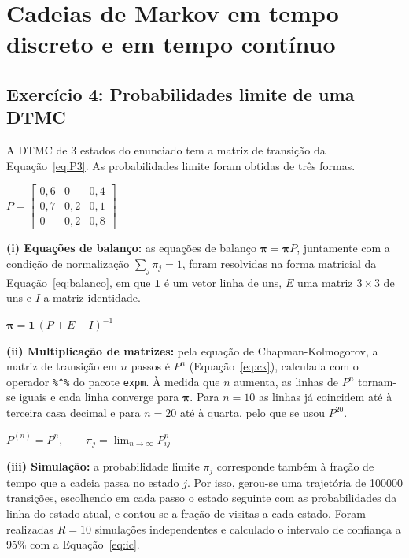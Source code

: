 \documentclass[10pt,a4paper]{article}
\newcommand{\formula}[3]{\begin{equacao}[H]\centering$\displaystyle #1$\caption{#2}\label{#3}\end{equacao}}
\begin{document}
\section{Cadeias de Markov em tempo discreto e em tempo contínuo}

\subsection{Exercício 4: Probabilidades limite de uma DTMC}

A DTMC de 3 estados do enunciado tem a matriz de transição da Equação~\ref{eq:P3}. As probabilidades limite foram obtidas de três formas.

\formula{P=\begin{bmatrix}0{,}6 & 0 & 0{,}4\\ 0{,}7 & 0{,}2 & 0{,}1\\ 0 & 0{,}2 & 0{,}8\end{bmatrix}}{Matriz de transição da DTMC de 3 estados.}{eq:P3}

\textbf{(i) Equações de balanço:} as equações de balanço $\boldsymbol{\pi}=\boldsymbol{\pi}P$, juntamente com a condição de normalização $\sum_j\pi_j=1$, foram resolvidas na forma matricial da Equação~\ref{eq:balanco}, em que $\mathbf{1}$ é um vetor linha de uns, $E$ uma matriz $3\times3$ de uns e $I$ a matriz identidade.

\formula{\boldsymbol{\pi}=\mathbf{1}\,(P+E-I)^{-1}}{Solução das equações de balanço da DTMC na forma matricial.}{eq:balanco}

\textbf{(ii) Multiplicação de matrizes:} pela equação de Chapman-Kolmogorov, a matriz de transição em $n$ passos é $P^n$ (Equação~\ref{eq:ck}), calculada com o operador \texttt{\%\^{}\%} do pacote \texttt{expm}. À medida que $n$ aumenta, as linhas de $P^n$ tornam-se iguais e cada linha converge para $\boldsymbol{\pi}$. Para $n=10$ as linhas já coincidem até à terceira casa decimal e para $n=20$ até à quarta, pelo que se usou $P^{20}$.

\formula{P^{(n)}=P^n,\qquad \pi_j=\lim_{n\to\infty}P^n_{ij}}{Equação de Chapman-Kolmogorov e probabilidades limite.}{eq:ck}

\textbf{(iii) Simulação:} a probabilidade limite $\pi_j$ corresponde também à fração de tempo que a cadeia passa no estado $j$. Por isso, gerou-se uma trajetória de \num{100000} transições, escolhendo em cada passo o estado seguinte com as probabilidades da linha do estado atual, e contou-se a fração de visitas a cada estado. Foram realizadas $R=10$ simulações independentes e calculado o intervalo de confiança a 95\% com a Equação~\ref{eq:ic}.
\end{document}
